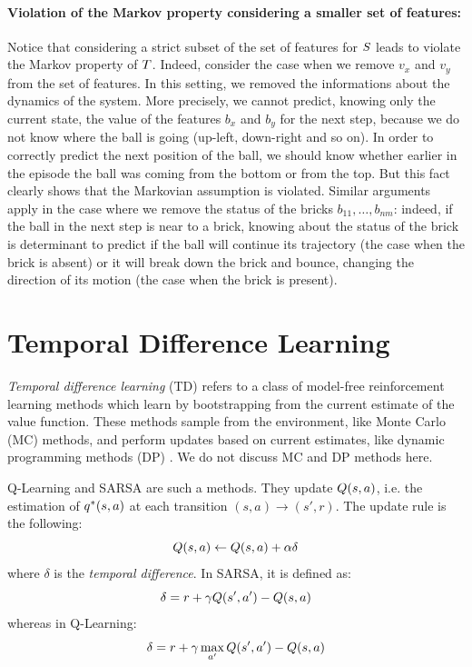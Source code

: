 \begin{example}
	\paragraph{Violation of the Markov property considering a smaller set of features:}
	Notice that considering a strict subset of the set of features for $S$ leads to violate the Markov property of $T$. Indeed, consider the case when we remove $v_x$ and $v_y$ from the set of features. In this setting, we removed the informations about the dynamics of the system. More precisely, we cannot predict, knowing only the current state, the value of the features $b_x$ and $b_y$ for the next step, because we do not know where the ball is going (up-left, down-right and so on). In order to correctly predict the next position of the ball, we should know whether earlier in the episode the ball was coming from the bottom or from the top. But this fact clearly shows that the Markovian assumption is violated. Similar arguments apply in the case where we remove the status of the bricks $b_{11}, \dots, b_{nm}$: indeed, if the ball in the next step is near to a brick, knowing about the status of the brick is determinant to predict if the ball will continue its trajectory (the case when the brick is absent) or it will break down the brick and bounce, changing the direction of its motion (the case when the brick is present).
	
\end{example}

\section{Temporal Difference Learning}
\label{sect:temporal-difference-learning}
\emph{Temporal difference learning} (TD) \citep{Sutton1988} refers to a class of model-free reinforcement learning methods which learn by bootstrapping from the current estimate of the value function. These methods sample from the environment, like Monte Carlo (MC) methods, and perform updates based on current estimates, like dynamic programming methods (DP) \citep{Bellman:1957}. We do not discuss MC and DP methods here.

Q-Learning \citep{watkins1989learning, Watkins1992} and SARSA are such a methods. They update $Q(s, a)$, i.e. the estimation of $q^*(s, a)$ at each transition $(s, a) \to (s', r)$. The update rule is the following:
\begin{equation}\label{td-update-rule}
Q(s, a) \leftarrow Q(s, a) + \alpha \delta
\end{equation}
where $\delta$ is the \emph{temporal difference}. In SARSA, it is defined as:
\begin{equation}\label{def:temporal-difference}
\delta = r + \gamma Q(s', a') - Q(s, a)
\end{equation}
whereas in Q-Learning:
\begin{equation}
\delta = r + \gamma \max_{a'} Q(s', a') - Q(s, a)
\end{equation}

